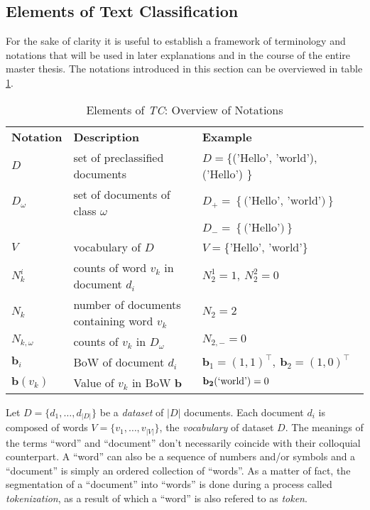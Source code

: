  \subsection{Elements of Text Classification}
 
For the sake of clarity it is useful to establish a framework of terminology and
notations that will be used in later explanations and in the course of 
the entire master thesis. The notations introduced in this section can be
overviewed in table \ref{tab:notations}.

\begin{table}
\begin{tabular}{|l|l|l|}

\textbf{Notation} & \textbf{Description} & \textbf{Example} \\

$D$ & set of preclassified documents & $D=$\{('Hello', 'world'),
('Hello') \} \\

$D_\omega$ & set of documents of class $\omega$ & $D_+ = \left\{
\text{('Hello', 'world')} \right\}$ \\
& & $D_- = \left\{ \text{('Hello')} \right\}$ \\ 

$V$ & vocabulary of $D$ & $V=$\{'Hello', 'world'\} \\

$N_k^i$ & counts of word $v_k$ in document $d_i$ & $N_2^1 = 1,\ N_2^2 = 0$ 
\\

$N_k$ & number of documents containing word $v_k$ & $N_2 = 2$ \\

$N_{k,\omega}$ & counts of $v_k$ in $D_\omega$ & $N_{2, -} = 0$ \\ 

$\mathbf{b}_i$ & BoW of document $d_i$ & $\mathbf{b}_1 = (1, 1)^\intercal,\
\mathbf{b}_2 = (1,0)^\intercal$ \\

$\mathbf{b}(v_k)$ & Value of $v_k$ in BoW $\mathbf{b}$ &
$\mathbf{b_2}(\text{\lq world\rq}) = 0$
 
\end{tabular}
\caption{Elements of \emph{TC}: Overview of Notations}
\label{tab:notations}
\end{table}

Let $D=\{d_1, \ldots, d_{|D|}\}$ be a \textit{dataset} of $|D|$
documents. Each document $d_i$ is composed of words $V = \{v_1, \ldots,
v_{|V|}\}$, the \textit{vocabulary} of dataset $D$.
The meanings of the terms ``word'' and ``document'' don't necessarily coincide
with their colloquial counterpart. A ``word'' can also be a sequence of numbers
and/or symbols and a ``document'' is simply an ordered collection of ``words''.
As a matter of fact, the segmentation of a ``document'' into ``words'' is done
during a process called \emph{tokenization}, as a result of which a
``word'' is also refered to as \emph{token}.

